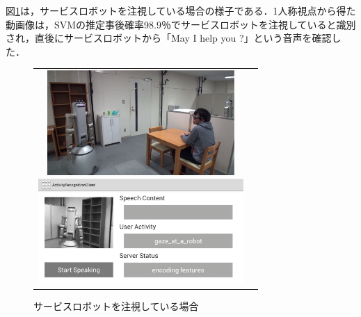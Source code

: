 図{\ref{fig:experiment_2_proactive_1}}は，サービスロボットを注視している場合の様子である．1人称視点から得た動画像は，SVMの推定事後確率98.9％でサービスロボットを注視していると識別され，直後にサービスロボットから「May I help you ?」という音声を確認した．
%
\vspace{5mm}
\begin{figure}[htbp]
\begin{tabular}{cc}
%
  \begin{minipage}{0.5\textwidth}
    \begin{center}
      \includegraphics[height=40mm]{figure/experiment_2_proactive_1.eps}
    \end{center}
  \end{minipage}
%
  \begin{minipage}{0.5\textwidth}
    \begin{center}
      \includegraphics[height=40mm]{figure/experiment_2_proactive_1_a.eps}
    \end{center}
  \end{minipage}
%
\end{tabular}
\caption{サービスロボットを注視している場合}
\label{fig:experiment_2_proactive_1}
\end{figure}

